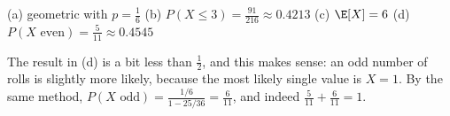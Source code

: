 \begin{solution}
	\begin{answer}
		(a) geometric with $p=\frac16$ \quad
		(b) $P(X\le3)=\frac{91}{216}\approx0.4213$ \quad
		(c) $\E[X]=6$ \quad
		(d) $P(X\text{ even})=\frac5{11}\approx0.4545$
	\end{answer}
	\begin{remark}
		The result in (d) is a bit less than $\frac12$, and this makes sense:
		an odd number of rolls is slightly more likely, because the most likely
		single value is $X=1$. By the same method,
		$P(X\text{ odd})=\frac{1/6}{1-25/36}=\frac{6}{11}$, and indeed
		$\frac5{11}+\frac6{11}=1$.
	\end{remark}
\end{solution}
